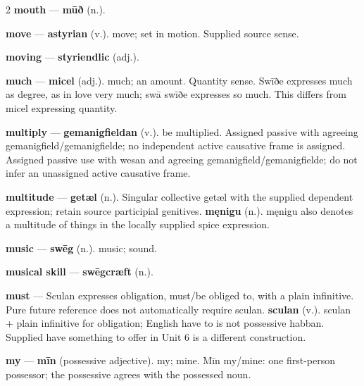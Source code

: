 \begin{multicols}{2}
\textbf{mouth} — \textbf{mūð} (n.).\par
\textbf{move} — \textbf{astyrian} (v.). move; set in motion. Supplied source sense.\par
\textbf{moving} — \textbf{styriendlic} (adj.).\par
\textbf{much} — \textbf{micel} (adj.). much; an amount. Quantity sense. Swīðe expresses much as degree, as in love very much; swā swīðe expresses so much. This differs from micel expressing quantity.\par
\textbf{multiply} — \textbf{gemanigfieldan} (v.). be multiplied. Assigned passive with agreeing gemanigfield/gemanigfielde; no independent active causative frame is assigned. Assigned passive use with wesan and agreeing gemanigfield/gemanigfielde; do not infer an unassigned active causative frame.\par
\textbf{multitude} — \textbf{getæl} (n.). Singular collective getæl with the supplied dependent expression; retain source participial genitives. \textbf{męnigu} (n.). męnigu also denotes a multitude of things in the locally supplied spice expression.\par
\textbf{music} — \textbf{swēg} (n.). music; sound.\par
\textbf{musical skill} — \textbf{swēgcræft} (n.).\par
\textbf{must} — Sculan expresses obligation, must/be obliged to, with a plain infinitive. Pure future reference does not automatically require sculan. \textbf{sculan} (v.). sculan + plain infinitive for obligation; English have to is not possessive habban. Supplied have something to offer in Unit 6 is a different construction.\par
\textbf{my} — \textbf{mīn} (possessive adjective). my; mine. Mīn my/mine: one first-person possessor; the possessive agrees with the possessed noun.\par

\end{multicols}
